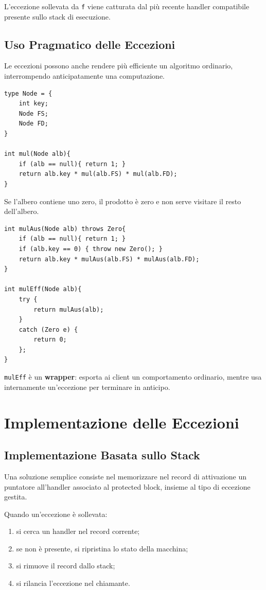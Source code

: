 \documentclass{article}
\begin{document}
L'eccezione sollevata da \texttt{f} viene catturata dal più recente handler compatibile presente sullo stack di esecuzione.

\subsection{Uso Pragmatico delle Eccezioni}

Le eccezioni possono anche rendere più efficiente un algoritmo ordinario, interrompendo anticipatamente una computazione.

\begin{lstlisting}
type Node = {
    int key;
    Node FS;
    Node FD;
}

int mul(Node alb){
    if (alb == null){ return 1; }
    return alb.key * mul(alb.FS) * mul(alb.FD);
}
\end{lstlisting}

Se l'albero contiene uno zero, il prodotto è zero e non serve visitare il resto dell'albero.

\begin{lstlisting}
int mulAus(Node alb) throws Zero{
    if (alb == null){ return 1; }
    if (alb.key == 0) { throw new Zero(); }
    return alb.key * mulAus(alb.FS) * mulAus(alb.FD);
}

int mulEff(Node alb){
    try {
        return mulAus(alb);
    }
    catch (Zero e) {
        return 0;
    };
}
\end{lstlisting}

\texttt{mulEff} è un \textbf{wrapper}: esporta ai client un comportamento ordinario, mentre usa internamente un'eccezione per terminare in anticipo.

\section{Implementazione delle Eccezioni}

\subsection{Implementazione Basata sullo Stack}

Una soluzione semplice consiste nel memorizzare nel record di attivazione un puntatore all'handler associato al protected block, insieme al tipo di eccezione gestita.

Quando un'eccezione è sollevata:
\begin{enumerate}
  \item si cerca un handler nel record corrente;
  \item se non è presente, si ripristina lo stato della macchina;
  \item si rimuove il record dallo stack;
  \item si rilancia l'eccezione nel chiamante.
\end{enumerate}
\end{document}
